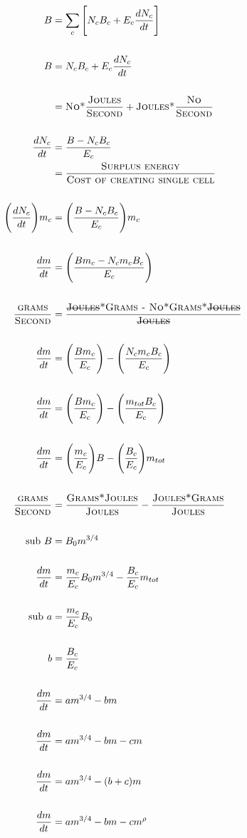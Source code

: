 \documentclass[a3paper]{article} %
\begin{document}
\begin{multicols}{2}
\newpage
\begin{align*}
    B &= \sum_c \Bigg[N_{c}B_{c} + E_{c}\frac{dN_{c}}{dt}\Bigg] \\ \\
    B &= N_{c}B_{c} + E_{c}\frac{dN_{c}}{dt} \\ \\
    &= \textsc{No*}\frac{\textsc{Joules}}{\textsc{Second}} + \textsc{Joules*}\frac{\textsc{No}}{\textsc{Second}}\\ \\
    \frac{dN_{c}}{dt} &= \frac{B - N_{c}B_{c}}{E_{c}} \\
    &= \frac{\textsc{Surplus energy}}{\textsc{Cost of creating single cell}} \\ \\
    \Bigg(\frac{dN_{c}}{dt}\Bigg)m_c &= \Bigg(\frac{B - N_{c}B_{c}}{E_{c}}\Bigg)m_c \\ \\
    \frac{dm}{dt} &= \Bigg(\frac{Bm_c - N_{c}m_{c}B_{c}}{E_c}\Bigg) \\ \\
    \frac{\textsc{grams}}{\textsc{Second}} &= \frac{\textsc{\st{Joules}*Grams - No*Grams*\st{Joules}}}{\textsc{\st{Joules}}} \\ \\
    \frac{dm}{dt} &= \Bigg(\frac{Bm_c}{E_c}\Bigg) - \Bigg(\frac{N_{c}m_{c}B_{c}}{E_c}\Bigg) \\ \\
    \frac{dm}{dt} &= \Bigg(\frac{Bm_c}{E_c}\Bigg) - \Bigg(\frac{m_{tot}B_{c}}{E_c}\Bigg) \\ \\
    \frac{dm}{dt} &= \Bigg(\frac{m_c}{E_c}\Bigg)B - \Bigg(\frac{B_{c}}{E_c}\Bigg)m_{tot} \\ \\
    \frac{\textsc{grams}}{\textsc{Second}} &= \frac{\textsc{Grams*Joules}}{\textsc{Joules}} - \frac{\textsc{Joules*Grams}}{\textsc{Joules}} \\ \\
    \text{sub } B &= B_{0}m^{3/4}  \\ \\
    \frac{dm}{dt} &= \frac{m_c}{E_c}B_{0}m^{3/4} - \frac{B_{c}}{E_c}m_{tot} \\ \\
    \text{sub } a &= \frac{m_c}{E_c}B_{0}  \\ \\
    b &= \frac{B_{c}}{E_c} \\ \\
    \frac{dm}{dt} &= am^{3/4} - bm \\ \\
    \frac{dm}{dt} &= am^{3/4} - bm - cm \\ \\
    \frac{dm}{dt} &= am^{3/4} - (b+c)m \\ \\
    \frac{dm}{dt} &= am^{3/4} - bm - cm^{\rho} \\ \\
\end{align*}


\end{multicols}
\end{document}
